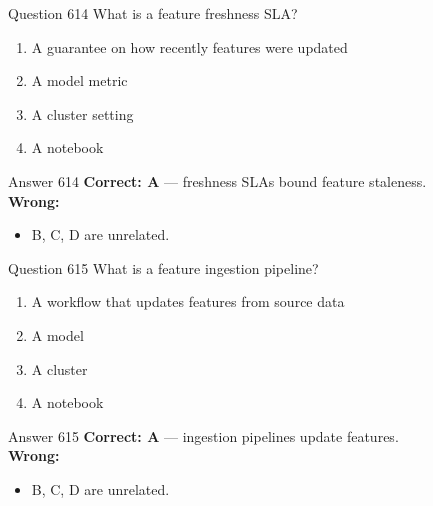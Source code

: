 \documentclass[aspectratio=169,11pt]{beamer}
\begin{document}
	\begin{frame}{Question 614}
		What is a feature freshness SLA?
		\begin{enumerate}[label=\Alph*.]
			\item A guarantee on how recently features were updated
			\item A model metric
			\item A cluster setting
			\item A notebook
		\end{enumerate}
	\end{frame}
	\begin{frame}{Answer 614}
		\textbf{Correct: A} --- freshness SLAs bound feature staleness.\\
		\vspace{0.5em}
		\textbf{Wrong:}
		\begin{itemize}
			\item B, C, D are unrelated.
		\end{itemize}
	\end{frame}
	
	\begin{frame}{Question 615}
		What is a feature ingestion pipeline?
		\begin{enumerate}[label=\Alph*.]
			\item A workflow that updates features from source data
			\item A model
			\item A cluster
			\item A notebook
		\end{enumerate}
	\end{frame}
	\begin{frame}{Answer 615}
		\textbf{Correct: A} --- ingestion pipelines update features.\\
		\vspace{0.5em}
		\textbf{Wrong:}
		\begin{itemize}
			\item B, C, D are unrelated.
		\end{itemize}
	\end{frame}
	
\end{document}
